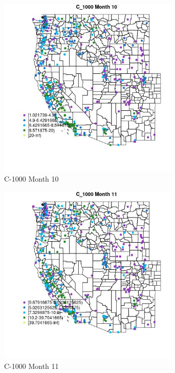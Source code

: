 \begin{figure} 
\centering  
\includegraphics[width=0.77\textwidth]{Code_Outputs/ML_input_report_ML_input_PM25_Step5_part_d_de_duplicated_aves_ML_input_MapObsMo10C_1000.jpg} 
\caption{\label{fig:ML_input_report_ML_input_PM25_Step5_part_d_de_duplicated_aves_ML_inputMapObsMo10C_1000}C-1000 Month 10} 
\end{figure} 
 

\begin{figure} 
\centering  
\includegraphics[width=0.77\textwidth]{Code_Outputs/ML_input_report_ML_input_PM25_Step5_part_d_de_duplicated_aves_ML_input_MapObsMo11C_1000.jpg} 
\caption{\label{fig:ML_input_report_ML_input_PM25_Step5_part_d_de_duplicated_aves_ML_inputMapObsMo11C_1000}C-1000 Month 11} 
\end{figure} 
 

